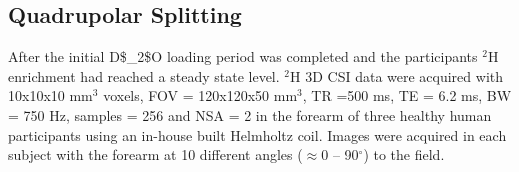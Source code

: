 


\subsection{Quadrupolar Splitting}

After the initial \ac{D$_2$O} loading period was completed and the participants $^2$H enrichment had reached a steady state level. $^2$H 3D \ac{CSI} data were acquired with 10x10x10 mm$^3$ voxels, \ac{FOV} = 120x120x50 mm$^3$, \ac{TR} =500 ms, \ac{TE} = 6.2 ms, \ac{BW} = 750 Hz, samples = 256 and NSA = 2 in the forearm of three healthy human participants using an in-house built Helmholtz coil. Images were acquired in each subject with the forearm at 10 different angles ($\approx$0 – 90$^\circ$) to the field. 

